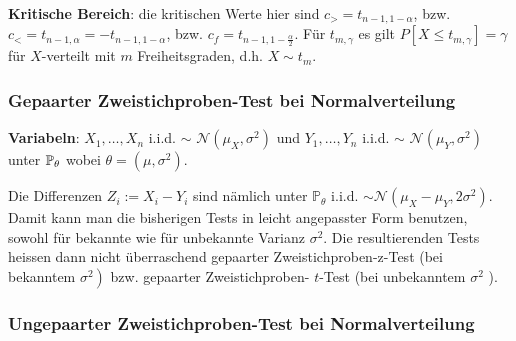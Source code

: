 \textbf{Kritische Bereich}: die kritischen Werte hier sind $c_{>}=t_{n-1,1-\alpha}$, bzw. $c_{<}=t_{n-1, \alpha}=-t_{n-1,1-\alpha}$, bzw. $c_{f}=t_{n-1,1-\frac{\alpha}{2}}$. Für $t_{m, \gamma}$ es gilt $P\left[X \leq t_{m, \gamma}\right]=\gamma$ für $X$-verteilt mit $m$ Freiheitsgraden, d.h. $X \sim t_{m}$.

\subsubsection*{Gepaarter Zweistichproben-Test bei Normalverteilung}

\textbf{Variabeln}: $X_1, \ldots , X_n$ i.i.d. $\sim$ $\mathcal{N}(\mu_X, \sigma^2)$ und $Y_1, \ldots , Y_n$ i.i.d. $\sim$ $\mathcal{N}(\mu_Y, \sigma^2)$ unter $\mathbb{P}_\theta$ wobei $\theta = (\mu, \sigma^2)$.

Die Differenzen $Z_{i}:=X_{i}-Y_{i}$ sind nämlich unter $\mathbb{P}_{\theta}$ i.i.d. $\sim \mathcal{N}\left(\mu_{X}-\mu_{Y}, 2 \sigma^{2}\right)$. Damit kann man die bisherigen Tests in leicht angepasster Form benutzen, sowohl für bekannte wie für unbekannte Varianz $\sigma^{2}$. Die resultierenden Tests heissen dann nicht überraschend gepaarter Zweistichproben-z-Test (bei bekanntem $\left.\sigma^{2}\right)$ bzw. gepaarter Zweistichproben- $t$-Test (bei unbekanntem $\sigma^{2}$ ).

\subsubsection*{Ungepaarter Zweistichproben-Test bei Normalverteilung}

